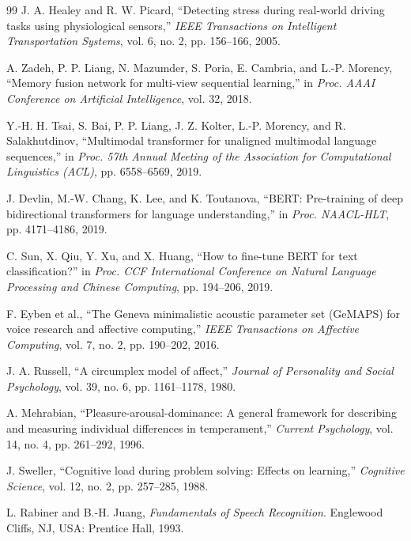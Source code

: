 \documentclass[conference]{IEEEtran}
\begin{document}
\begin{thebibliography}{99}
J. A. Healey and R. W. Picard, ``Detecting stress during real-world driving tasks using physiological sensors,'' \textit{IEEE Transactions on Intelligent Transportation Systems}, vol. 6, no. 2, pp. 156--166, 2005.

A. Zadeh, P. P. Liang, N. Mazumder, S. Poria, E. Cambria, and L.-P. Morency, ``Memory fusion network for multi-view sequential learning,'' in \textit{Proc. AAAI Conference on Artificial Intelligence}, vol. 32, 2018.

Y.-H. H. Tsai, S. Bai, P. P. Liang, J. Z. Kolter, L.-P. Morency, and R. Salakhutdinov, ``Multimodal transformer for unaligned multimodal language sequences,'' in \textit{Proc. 57th Annual Meeting of the Association for Computational Linguistics (ACL)}, pp. 6558--6569, 2019.

J. Devlin, M.-W. Chang, K. Lee, and K. Toutanova, ``BERT: Pre-training of deep bidirectional transformers for language understanding,'' in \textit{Proc. NAACL-HLT}, pp. 4171--4186, 2019.

C. Sun, X. Qiu, Y. Xu, and X. Huang, ``How to fine-tune BERT for text classification?'' in \textit{Proc. CCF International Conference on Natural Language Processing and Chinese Computing}, pp. 194--206, 2019.

F. Eyben et al., ``The Geneva minimalistic acoustic parameter set (GeMAPS) for voice research and affective computing,'' \textit{IEEE Transactions on Affective Computing}, vol. 7, no. 2, pp. 190--202, 2016.

J. A. Russell, ``A circumplex model of affect,'' \textit{Journal of Personality and Social Psychology}, vol. 39, no. 6, pp. 1161--1178, 1980.

A. Mehrabian, ``Pleasure-arousal-dominance: A general framework for describing and measuring individual differences in temperament,'' \textit{Current Psychology}, vol. 14, no. 4, pp. 261--292, 1996.

J. Sweller, ``Cognitive load during problem solving: Effects on learning,'' \textit{Cognitive Science}, vol. 12, no. 2, pp. 257--285, 1988.

L. Rabiner and B.-H. Juang, \textit{Fundamentals of Speech Recognition}. Englewood Cliffs, NJ, USA: Prentice Hall, 1993.


\end{thebibliography}
\end{document}

